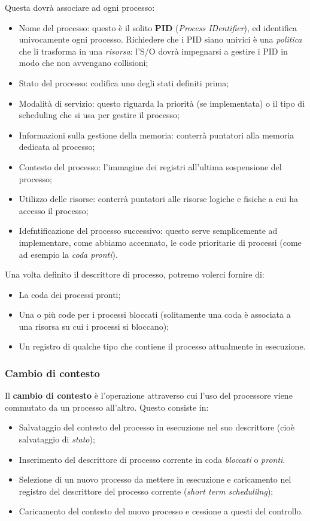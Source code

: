 \documentclass[a4paper,11pt]{article}
\begin{document}
Questa dovrà associare ad ogni processo:
\begin{itemize}
	\item Nome del processo: questo è il solito \textbf{PID} (\textit{Process IDentifier}), ed identifica univocamente ogni processo. Richiedere che i PID siano univici è una \textit{politica} che li trasforma in una \textit{risorsa}: l'S/O dovrà impegnarsi a gestire i PID in modo che non avvengano collisioni;
	\item Stato del processo: codifica uno degli stati definiti prima;
	\item Modalità di servizio: questo riguarda la priorità (se implementata) o il tipo di scheduling che si usa per gestire il processo;
	\item Informazioni sulla gestione della memoria: conterrà puntatori alla memoria dedicata al processo;
	\item Contesto del processo: l'immagine dei registri all'ultima sospensione del processo;
	\item Utilizzo delle risorse: conterrà puntatori alle risorse logiche e fisiche a cui ha accesso il processo;
	\item Idefntificazione del processo successivo: questo serve semplicemente ad implementare, come abbiamo accennato, le code prioritarie di processi (come ad esempio la \textit{coda pronti}).
\end{itemize}

Una volta definito il descrittore di processo, potremo volerci fornire di:
\begin{itemize}
	\item La coda dei processi pronti;
	\item Una o più code per i processi bloccati (solitamente una coda è associata a una risorsa su cui i processi si bloccano);
	\item Un registro di qualche tipo che contiene il processo attualmente in esecuzione. 
\end{itemize}

\subsubsection{Cambio di contesto}
Il \textbf{cambio di contesto} è l'operazione attraverso cui l'uso del processore viene commutato da un processo all'altro.
Questo consiste in:
\begin{itemize}
	\item Salvataggio del contesto del processo in esecuzione nel suo descrittore (cioè salvataggio di \textit{stato});
	\item Inserimento del descrittore di processo corrente in coda \textit{bloccati} o \textit{pronti}.
	\item Selezione di un nuovo processo da mettere in esecuzione e caricamento nel registro del descrittore del processo corrente (\textit{short term schedulilng});
	\item Caricamento del contesto del nuovo processo e cessione a questi del controllo. 
\end{itemize}
\end{document}
